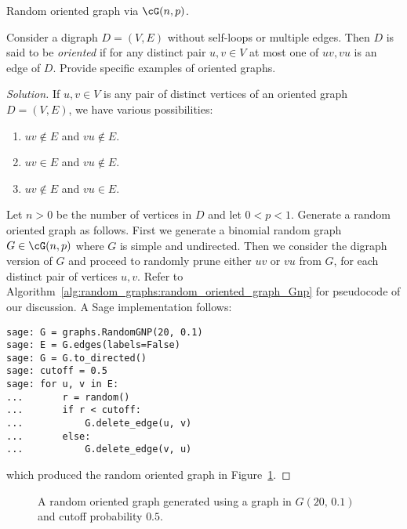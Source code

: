 \begin{algorithm}[!htbp]

\caption{Random oriented graph via $\cG(n,p)$.}
\label{alg:random_graphs:random_oriented_graph_Gnp}
\end{algorithm}

\begin{example}
\label{eg:random_graphs:random_oriented_graph}
Consider a digraph $D = (V,E)$ without self-loops or multiple
edges. Then $D$ is said to be \emph{oriented} if
for any distinct pair $u,v \in V$ at most one of $uv, vu$ is an edge
of $D$. Provide specific examples of oriented graphs.
\end{example}

\begin{proof}[Solution]
If $u,v \in V$ is any pair of distinct vertices of an oriented graph
$D = (V,E)$, we have various possibilities:
\begin{enumerate}
\item $uv \notin E$ and $vu \notin E$.

\item $uv \in E$ and $vu \notin E$.

\item $uv \notin E$ and $vu \in E$.
\end{enumerate}
Let $n > 0$ be the number of vertices in $D$ and let
$0 < p < 1$. Generate a random oriented graph as follows. First we
generate a binomial random graph $G \in \cG(n,p)$ where $G$ is simple
and undirected. Then we consider the digraph version of $G$ and
proceed to randomly prune either $uv$ or $vu$ from $G$, for each
distinct pair of vertices $u,v$. Refer to
Algorithm~\ref{alg:random_graphs:random_oriented_graph_Gnp} for
pseudocode of our discussion. A Sage implementation follows:
\begin{lstlisting}
sage: G = graphs.RandomGNP(20, 0.1)
sage: E = G.edges(labels=False)
sage: G = G.to_directed()
sage: cutoff = 0.5
sage: for u, v in E:
...       r = random()
...       if r < cutoff:
...           G.delete_edge(u, v)
...       else:
...           G.delete_edge(v, u)
\end{lstlisting}
which produced the random oriented graph in
Figure~\ref{fig:random_graphs:random_oriented_graph}.
\end{proof}

\begin{figure}[!htbp]
\centering
{}

\caption{A random oriented graph generated using a graph in
  $G(20,\, 0.1)$ and cutoff probability $0.5$.}
\label{fig:random_graphs:random_oriented_graph}
\end{figure}


